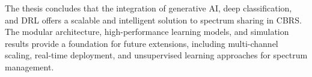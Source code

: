 The thesis concludes that the integration of generative AI, deep classification, and DRL offers a scalable and intelligent solution to spectrum sharing in CBRS. The modular architecture, high-performance learning models, and simulation results provide a foundation for future extensions, including multi-channel scaling, real-time deployment, and unsupervised learning approaches for spectrum management.



